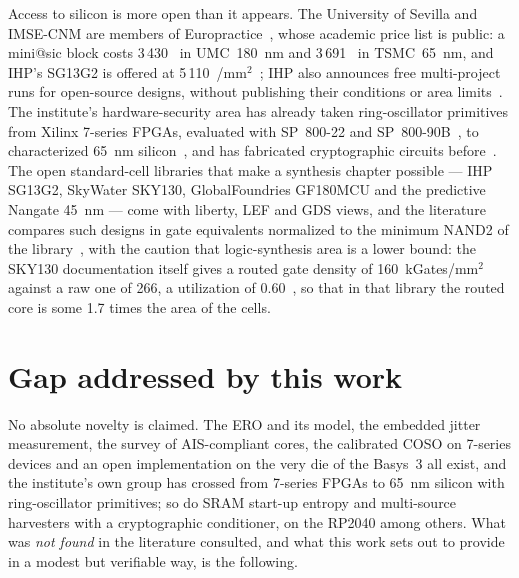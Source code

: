 Access to silicon is more open than it appears. The University of Sevilla
and IMSE-CNM are members of Europractice~\cite{europractice_memberlist},
whose academic price list is public: a mini@sic block costs 3\,430~\texteuro{}
in UMC~180~nm and 3\,691~\texteuro{} in TSMC~65~nm, and IHP's SG13G2 is
offered at 5\,110~\texteuro{}/mm$^2$~\cite{europractice_prices2026,
europractice_minisic}; IHP also announces free multi-project runs for
open-source designs, without publishing their conditions or area
limits~\cite{ihp_openpdk}. The institute's hardware-security area has
already taken
ring-oscillator primitives from Xilinx 7-series FPGAs, evaluated with
SP~800-22 and SP~800-90B~\cite{rojas2022trngcapability}, to characterized
65~nm silicon~\cite{imse_area_hwsec,
martinez2022efficientropuf, ortega2024vlsi65nm, ortega2026ropuf65nm}, and
has fabricated cryptographic circuits before~\cite{mora2020trivium}. The
open standard-cell libraries that make a synthesis chapter possible ---
IHP SG13G2, SkyWater SKY130, GlobalFoundries GF180MCU and the predictive
Nangate 45~nm --- come with liberty, LEF and GDS views, and the literature
compares such designs in gate equivalents normalized to the minimum NAND2
of the library~\cite{ihp_openpdk_repo, skywater_pdk_cells, gf180mcu_pdk,
nangate45}, with the caution that logic-synthesis area is a
lower bound: the SKY130 documentation itself gives a routed gate density
of 160~kGates/mm$^2$ against a raw one of 266, a utilization of
0.60~\cite{skywater_pdk_cells}, so that in that library the routed core
is some 1.7 times the area of the cells.

\section{Gap addressed by this work}
\label{sec:gap}

No absolute novelty is claimed. The ERO and its model, the embedded
jitter measurement, the survey of AIS-compliant cores, the calibrated
COSO on 7-series devices and an open implementation on the very die of
the Basys~3 all exist, and the institute's own group has crossed from
7-series FPGAs to 65~nm silicon with ring-oscillator primitives; so do
SRAM start-up entropy and multi-source harvesters with a cryptographic
conditioner, on the RP2040 among others. What was
\emph{not found} in the literature consulted, and what this work sets out
to provide in a modest but verifiable way, is the following.

